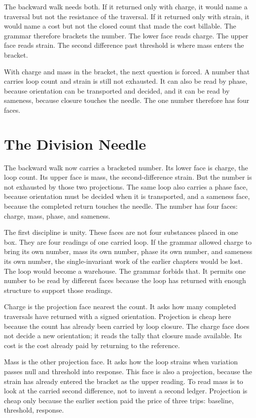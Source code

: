 The backward walk needs both. If it returned only with charge, it would name
a traversal but not the resistance of the traversal. If it returned only with
strain, it would name a cost but not the closed count that made the cost
billable. The grammar therefore brackets the number. The lower face reads
charge. The upper face reads strain. The second difference past threshold is
where mass enters the bracket.

With charge and mass in the bracket, the next question is forced. A number
that carries loop count and strain is still not exhausted. It can also be
read by phase, because orientation can be transported and decided, and it
can be read by sameness, because closure touches the needle. The one number
therefore has four faces.

\section{The Division Needle}

The backward walk now carries a bracketed number. Its lower face is charge,
the loop count. Its upper face is mass, the second-difference strain. But the
number is not exhausted by those two projections. The same loop also carries
a phase face, because orientation must be decided when it is transported, and
a sameness face, because the completed return touches the needle. The number
has four faces: charge, mass, phase, and sameness.

The first discipline is unity. These faces are not four substances placed in
one box. They are four readings of one carried loop. If the grammar allowed
charge to bring its own number, mass its own number, phase its own number,
and sameness its own number, the single-invariant work of the earlier
chapters would be lost. The loop would become a warehouse. The grammar
forbids that. It permits one number to be read by different faces because
the loop has returned with enough structure to support those readings.

Charge is the projection face nearest the count. It asks how many completed
traversals have returned with a signed orientation. Projection is cheap here
because the count has already been carried by loop closure. The charge face
does not decide a new orientation; it reads the tally that closure made
available. Its cost is the cost already paid by returning to the reference.

Mass is the other projection face. It asks how the loop strains when
variation passes null and threshold into response. This face is also a
projection, because the strain has already entered the bracket as the upper
reading. To read mass is to look at the carried second difference, not to
invent a second ledger. Projection is cheap only because the earlier section
paid the price of three trips: baseline, threshold, response.

